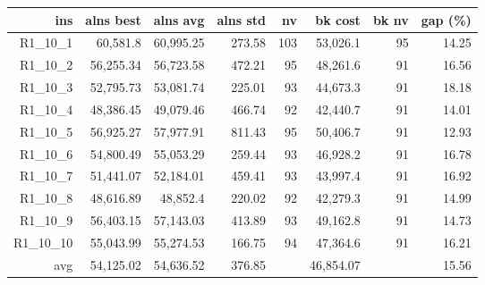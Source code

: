   \begin{table}[caption={Kết quả đo với tập HG\_R\_1\_10 1000 yêu cầu}, label=exp:HGR110]
    \small
    \centering
    \begin{tabular}{rrrrrrrr}
    \hline
    ins & alns best & alns avg & alns std & nv & bk cost & bk nv & gap (\%) \\ \hline
    R1\_10\_1 & 60,581.8 & 60,995.25 & 273.58 & 103 & 53,026.1 & 95 & 14.25 \\ \hline
    R1\_10\_2 & 56,255.34 & 56,723.58 & 472.21 & 95 & 48,261.6 & 91 & 16.56 \\ \hline
    R1\_10\_3 & 52,795.73 & 53,081.74 & 225.01 & 93 & 44,673.3 & 91 & 18.18 \\ \hline
    R1\_10\_4 & 48,386.45 & 49,079.46 & 466.74 & 92 & 42,440.7 & 91 & 14.01 \\ \hline
    R1\_10\_5 & 56,925.27 & 57,977.91 & 811.43 & 95 & 50,406.7 & 91 & 12.93 \\ \hline
    R1\_10\_6 & 54,800.49 & 55,053.29 & 259.44 & 93 & 46,928.2 & 91 & 16.78 \\ \hline
    R1\_10\_7 & 51,441.07 & 52,184.01 & 459.41 & 93 & 43,997.4 & 91 & 16.92 \\ \hline
    R1\_10\_8 & 48,616.89 & 48,852.4 & 220.02 & 92 & 42,279.3 & 91 & 14.99 \\ \hline
    R1\_10\_9 & 56,403.15 & 57,143.03 & 413.89 & 93 & 49,162.8 & 91 & 14.73 \\ \hline
    R1\_10\_10 & 55,043.99 & 55,274.53 & 166.75 & 94 & 47,364.6 & 91 & 16.21 \\ \hline
    avg & 54,125.02 & 54,636.52 & 376.85 & & 46,854.07 & & 15.56 \\ \hline
    \end{tabular}
  \end{table}

